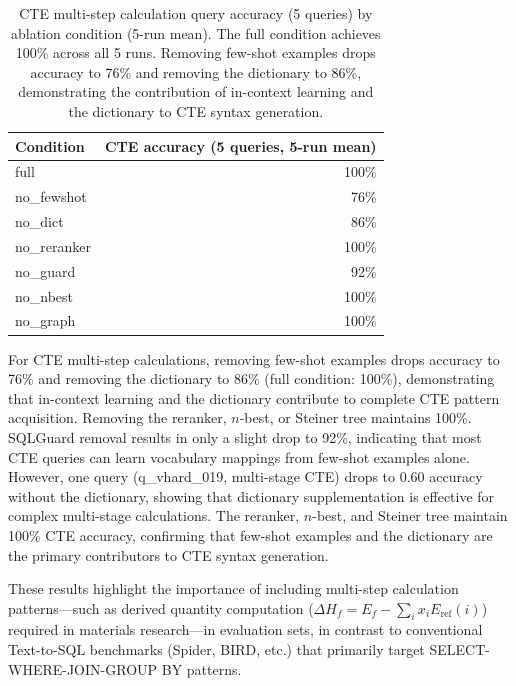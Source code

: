 \documentclass{npj-compt.mater}
\begin{document}
\begin{table}[t]
\centering
\caption{CTE multi-step calculation query accuracy (5 queries) by
ablation condition (5-run mean). The full condition achieves 100\%
across all 5 runs. Removing few-shot examples drops accuracy to
76\% and removing the dictionary to 86\%, demonstrating the
contribution of in-context learning and the dictionary to CTE
syntax generation.}
\label{tab:cte_results}
\small
\begin{tabular}{@{}lr@{}}
\toprule
Condition & CTE accuracy (5 queries, 5-run mean) \\
\midrule
full          & 100\% \\
no\_fewshot   & 76\% \\
no\_dict      & 86\% \\
no\_reranker  & 100\% \\
no\_guard     & 92\% \\
no\_nbest     & 100\% \\
no\_graph     & 100\% \\
\bottomrule
\end{tabular}
\end{table}

For CTE multi-step calculations, removing few-shot examples drops
accuracy to 76\% and removing the dictionary to 86\% (full
condition: 100\%), demonstrating that in-context learning and the
dictionary contribute to complete CTE pattern acquisition.
Removing the reranker, $n$-best, or Steiner tree maintains 100\%.
SQLGuard removal results in only a slight drop to 92\%, indicating
that most CTE queries can learn vocabulary mappings from few-shot
examples alone.
However, one query (q\_vhard\_019, multi-stage CTE) drops to 0.60
accuracy without the dictionary, showing that dictionary
supplementation is effective for complex multi-stage calculations.
The reranker, $n$-best, and Steiner tree maintain 100\% CTE
accuracy, confirming that few-shot examples and the dictionary are
the primary contributors to CTE syntax generation.

These results highlight the importance of including multi-step
calculation patterns---such as derived quantity computation
($\Delta H_f = E_f - \sum_i x_i E_{\mathrm{ref}}(i)$) required
in materials research---in evaluation sets, in contrast to
conventional Text-to-SQL benchmarks (Spider, BIRD, etc.) that
primarily target SELECT-WHERE-JOIN-GROUP BY patterns.
\end{document}
